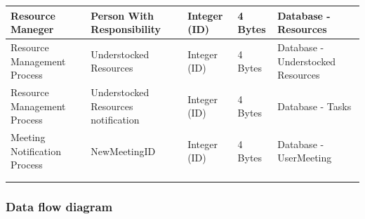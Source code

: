 \begin{table}[]
\begin{tabular}{|l|l|l|l|l|}
Resource Maneger & Person With Responsibility & Integer (ID) & 4 Bytes & Database - Resources \\ \hline
Resource Management Process & Understocked Resources & Integer (ID) & 4 Bytes & Database - Understocked Resources \\ \hline
Resource Management Process & Understocked Resources notification & Integer (ID) & 4 Bytes & Database - Tasks \\ \hline
Meeting Notification Process & NewMeetingID & Integer (ID) & 4 Bytes & Database - UserMeeting \\ \hline
 &  &  &  &  \\ \hline
 &  &  &  &  \\ \hline
\end{tabular}
\end{table}

\subsubsection{Data flow diagram}

